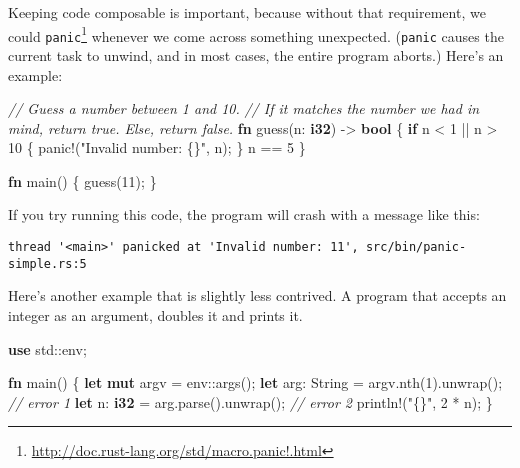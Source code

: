 \documentclass[a4paper,]{book}
\newenvironment{Shaded}{\begin{snugshade}}{\end{snugshade}}
\newcommand{\KeywordTok}[1]{\textcolor[rgb]{0.13,0.29,0.53}{\textbf{{#1}}}}
\newcommand{\DecValTok}[1]{\textcolor[rgb]{0.00,0.00,0.81}{{#1}}}
\newcommand{\StringTok}[1]{\textcolor[rgb]{0.31,0.60,0.02}{{#1}}}
\newcommand{\CommentTok}[1]{\textcolor[rgb]{0.56,0.35,0.01}{\textit{{#1}}}}
\newcommand{\OtherTok}[1]{\textcolor[rgb]{0.56,0.35,0.01}{{#1}}}
\newcommand{\NormalTok}[1]{{#1}}
\renewcommand{\href}[2]{#2\footnote{\url{#1}}}
\begin{document}
Keeping code composable is important, because without that requirement,
we could
\href{http://doc.rust-lang.org/std/macro.panic!.html}{\texttt{panic}}
whenever we come across something unexpected. (\texttt{panic} causes the
current task to unwind, and in most cases, the entire program aborts.)
Here's an example:

\begin{Shaded}
\begin{Highlighting}[]
\CommentTok{// Guess a number between 1 and 10.}
\CommentTok{// If it matches the number we had in mind, return true. Else, return false.}
\KeywordTok{fn} \NormalTok{guess(n: }\KeywordTok{i32}\NormalTok{) -> }\KeywordTok{bool} \NormalTok{\{}
    \KeywordTok{if} \NormalTok{n < }\DecValTok{1} \NormalTok{|| n > }\DecValTok{10} \NormalTok{\{}
        \OtherTok{panic!}\NormalTok{(}\StringTok{"Invalid number: \{\}"}\NormalTok{, n);}
    \NormalTok{\}}
    \NormalTok{n == }\DecValTok{5}
\NormalTok{\}}

\KeywordTok{fn} \NormalTok{main() \{}
    \NormalTok{guess(}\DecValTok{11}\NormalTok{);}
\NormalTok{\}}
\end{Highlighting}
\end{Shaded}

If you try running this code, the program will crash with a message like
this:

\begin{verbatim}
thread '<main>' panicked at 'Invalid number: 11', src/bin/panic-simple.rs:5
\end{verbatim}

Here's another example that is slightly less contrived. A program that
accepts an integer as an argument, doubles it and prints it.


\begin{Shaded}
\begin{Highlighting}[]
\KeywordTok{use} \NormalTok{std::env;}

\KeywordTok{fn} \NormalTok{main() \{}
    \KeywordTok{let} \KeywordTok{mut} \NormalTok{argv = env::args();}
    \KeywordTok{let} \NormalTok{arg: String = argv.nth(}\DecValTok{1}\NormalTok{).unwrap(); }\CommentTok{// error 1}
    \KeywordTok{let} \NormalTok{n: }\KeywordTok{i32} \NormalTok{= arg.parse().unwrap(); }\CommentTok{// error 2}
    \OtherTok{println!}\NormalTok{(}\StringTok{"\{\}"}\NormalTok{, }\DecValTok{2} \NormalTok{* n);}
\NormalTok{\}}
\end{Highlighting}
\end{Shaded}
\end{document}
